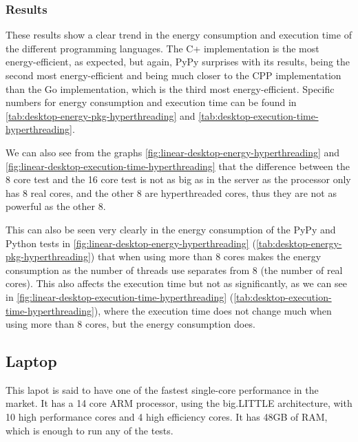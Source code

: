 \subsubsection{Results}






These results show a clear trend in the energy consumption and execution time of the different programming languages. The C\++ implementation is the most energy-efficient, as expected, but again, PyPy surprises with its results, being the second most energy-efficient and being much closer to the \gls{CPP} implementation than the Go implementation, which is the third most energy-efficient. Specific numbers for energy consumption and execution time can be found in \autoref{tab:desktop-energy-pkg-hyperthreading} and \autoref{tab:desktop-execution-time-hyperthreading}.

We can also see from the graphs \autoref{fig:linear-desktop-energy-hyperthreading} and \autoref{fig:linear-desktop-execution-time-hyperthreading} that the difference between the 8 core test and the 16 core test is not as big as in the server as the processor only has 8 real cores, and the other 8 are hyperthreaded cores, thus they are not as powerful as the other 8. 

This can also be seen very clearly in the energy consumption of the PyPy and Python tests in \autoref{fig:linear-desktop-energy-hyperthreading} (\autoref{tab:desktop-energy-pkg-hyperthreading}) that when using more than 8 cores makes the energy consumption as the number of threads use separates from 8 (the number of real cores). This also affects the execution time but not as significantly, as we can see in \autoref{fig:linear-desktop-execution-time-hyperthreading} (\autoref{tab:desktop-execution-time-hyperthreading}), where the execution time does not change much when using more than 8 cores, but the energy consumption does.



\subsection{Laptop}
This lapot is said to have one of the fastest single-core performance in the market. It has a 14 core ARM processor, using the big.LITTLE architecture, with 10 high performance cores and 4 high efficiency cores. It has 48GB of RAM, which is enough to run any of the tests.


